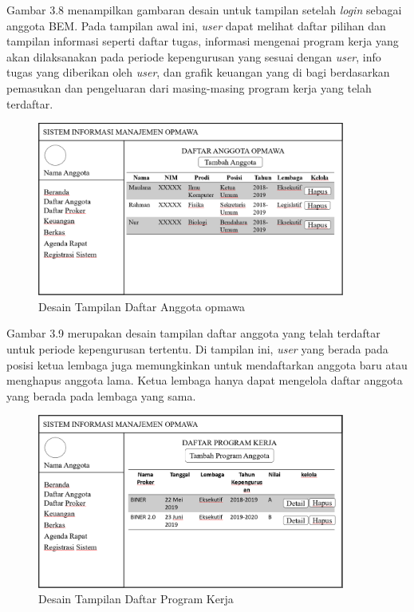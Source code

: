 Gambar 3.8 menampilkan gambaran desain untuk tampilan setelah \textit{login} sebagai anggota BEM. Pada tampilan awal ini, \textit{user} dapat melihat daftar pilihan dan tampilan informasi seperti daftar tugas, informasi mengenai program kerja yang akan dilaksanakan pada periode kepengurusan yang sesuai dengan \textit{user}, info tugas yang diberikan oleh \textit{user}, dan grafik keuangan yang di bagi berdasarkan pemasukan dan pengeluaran dari masing-masing program kerja yang telah terdaftar.


\begin{figure}[H]
	\centering
	\includegraphics[width=0.9\textwidth]{gambar/tampilananggota}
	\caption{Desain Tampilan Daftar Anggota opmawa}
	\label{Tampilan_anggota}
\end{figure}

Gambar 3.9 merupakan desain tampilan daftar anggota yang telah terdaftar untuk periode kepengurusan tertentu. Di tampilan ini, \textit{user} yang berada pada posisi ketua lembaga juga memungkinkan untuk mendaftarkan anggota baru atau menghapus anggota lama. Ketua lembaga hanya dapat mengelola daftar anggota yang berada pada lembaga yang sama.

\begin{figure}[H]
	\centering
	\includegraphics[width=0.9\textwidth]{gambar/tampilanproker}
	\caption{Desain Tampilan Daftar Program Kerja}
	\label{Tampilan_proker}
\end{figure}

